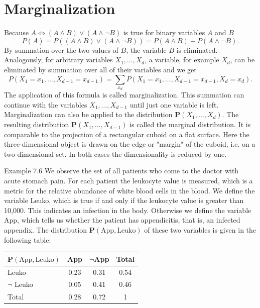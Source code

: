 \documentclass[10pt]{book}
\begin{document}
\section{Marginalization}
Because $A \Leftrightarrow(A \wedge B) \vee(A \wedge \neg B)$ is true for binary variables $A$ and $B$
$$
P(A)=P((A \wedge B) \vee(A \wedge \neg B))=P(A \wedge B)+P(A \wedge \neg B) .
$$
By summation over the two values of $B$, the variable $B$ is eliminated. Analogously, for arbitrary variables $X_{1}, \ldots, X_{d}$, a variable, for example $X_{d}$, can be eliminated by summation over all of their variables and we get
$$
P\left(X_{1}=x_{1}, \ldots, X_{d-1}=x_{d-1}\right)=\sum_{x_{d}} P\left(X_{1}=x_{1}, \ldots, X_{d-1}=x_{d-1}, X_{d}=x_{d}\right) .
$$
The application of this formula is called marginalization. This summation can continue with the variables $X_{1}, \ldots, X_{d-1}$ until just one variable is left. Marginalization can also be applied to the distribution $\boldsymbol{P}\left(X_{1}, \ldots, X_{d}\right)$. The resulting distribution $\boldsymbol{P}\left(X_{1}, \ldots, X_{d-1}\right)$ is called the marginal distribution. It is comparable to the projection of a rectangular cuboid on a flat surface. Here the three-dimensional object is drawn on the edge or "margin" of the cuboid, i.e. on a two-dimensional set. In both cases the dimensionality is reduced by one.

Example 7.6 We observe the set of all patients who come to the doctor with acute stomach pain. For each patient the leukocyte value is measured, which is a metric for the relative abundance of white blood cells in the blood. We define the variable Leuko, which is true if and only if the leukocyte value is greater than 10,000. This indicates an infection in the body. Otherwise we define the variable App, which tells us whether the patient has appendicitis, that is, an infected appendix. The distribution $\boldsymbol{P}(\text{App}, \text{Leuko})$ of these two variables is given in the following table:

\begin{center}
\begin{tabular}{lccc}
\hline
$\boldsymbol{P}(\text{App},\text{Leuko})$ & App & $\neg$App & Total \\
\hline
Leuko & 0.23 & 0.31 & 0.54 \\
$\neg$ Leuko & 0.05 & 0.41 & 0.46 \\
\hline
Total & 0.28 & 0.72 & 1 \\
\hline
\end{tabular}
\end{center}
\end{document}
